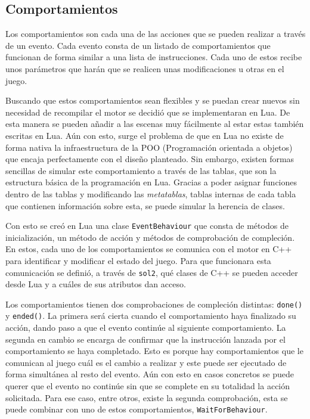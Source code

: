 \subsection{Comportamientos}
Los comportamientos son cada una de las acciones que se pueden realizar a través de un evento. Cada evento consta de un listado de comportamientos que funcionan de forma similar a una lista de instrucciones. Cada uno de estos recibe unos parámetros que harán que se realicen unas modificaciones u otras en el juego.

\medskip

Buscando que estos comportamientos sean flexibles y se puedan crear nuevos sin necesidad de recompilar el motor se decidió que se implementaran en Lua. De esta manera se pueden añadir a las escenas muy fácilmente al estar estas también escritas en Lua. Aún con esto, surge el problema de que en Lua no existe de forma nativa la infraestructura de la POO (Programación orientada a objetos) que encaja perfectamente con el diseño planteado. Sin embargo, existen formas sencillas de simular este comportamiento a través de las tablas, que son la estructura básica de la programación en Lua. Gracias a poder asignar funciones dentro de las tablas y modificando las \textit{metatablas}, tablas internas de cada tabla que contienen información sobre esta, se puede simular la herencia de clases.

\medskip

Con esto se creó en Lua una clase \texttt{EventBehaviour} que consta de métodos de inicialización, un método de acción y métodos de comprobación de compleción. En estos, cada uno de los comportamientos se comunica con el motor en C++ para identificar y modificar el estado del juego. Para que funcionara esta comunicación se definió, a través de \texttt{sol2}, qué clases de C++ se pueden acceder desde Lua y a cuáles de sus atributos dan acceso.

\medskip

Los comportamientos tienen dos comprobaciones de compleción distintas: \texttt{done()} y \texttt{ended()}. La primera será cierta cuando el comportamiento haya finalizado su acción, dando paso a que el evento continúe al siguiente comportamiento. La segunda en cambio se encarga de confirmar que la instrucción lanzada por el comportamiento se haya completado. Esto es porque hay comportamientos que le comunican al juego cuál es el cambio a realizar y este puede ser ejecutado de forma simultánea al resto del evento. Aún con esto en casos concretos se puede querer que el evento no continúe sin que se complete en su totalidad la acción solicitada. Para ese caso, entre otros, existe la segunda comprobación, esta se puede combinar con uno de estos comportamientos, \texttt{WaitForBehaviour}.

